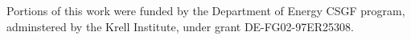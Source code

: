 \documentclass{mc2015}
\begin{document}
Portions of this work were funded by the Department of Energy CSGF program, adminstered by the Krell Institute, under grant DE-FG02-97ER25308.

\setlength{\baselineskip}{12pt}




%
%
\end{document}
